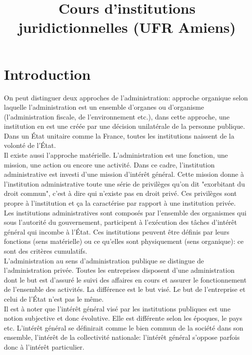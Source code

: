 \documentclass[12pt, a4paper, openany]{book}
\date{}
\title{Cours d'institutions juridictionnelles (UFR Amiens)}
\begin{document}
\chapter{Introduction}

On peut distinguer deux approches de l'administration: approche organique selon laquelle l'administration est un ensemble d'organes ou d'organisme (l'administration fiscale, de l'environnement etc.), dans cette approche, une institution en est une créée par une décision unilatérale de la personne publique. Dans un État unitaire comme la France, toutes les institutions naissent de la volonté de l'État. \\
Il existe aussi l'approche matérielle. L'administration est une fonction, une mission, une action ou encore une activité. Dans ce cadre, l'institution administrative est investi d'une mission d'intérêt général. Cette mission donne à l'institution administrative toute une série de privilèges qu'on dit "exorbitant du droit commun", c'est à dire qui n'existe pas en droit privé. Ces privilèges sont propre à l'institution et ça la caractérise par rapport à une institution privée. \\
Les institutions administratives sont composés par l'ensemble des organismes qui sous l'autorité du gouvernement, participent à l'exécution des tâches d'intérêt général qui incombe à l'État. Ces institutions peuvent être définis par leurs fonctions (sens matérielle) ou ce qu'elles sont physiquement (sens organique): ce sont des critères cumulatifs. \\
L'administration au sens d'administration publique se distingue de l'administration privée. Toutes les entreprises disposent d'une administration dont le but est d'assuré le suivi des affaires en cours et assurer le fonctionnement de l'ensemble des activités. La différence est le but visé. Le but de l'entreprise et celui de l'État n'est pas le même. \\
Il est à noter que l'intérêt général visé par les institutions publiques est une notion subjective et donc évolutive. Elle est différente selon les époques, le pays etc. L'intérêt général se définirait comme le bien commun de la société dans son ensemble, l'intérêt de la collectivité nationale: l'intérêt général s'oppose parfois donc à l'intérêt particulier.
\end{document}
